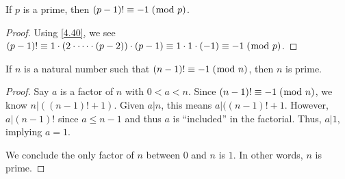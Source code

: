 \documentclass[../main.tex]{subfiles}
\begin{document}
\begin{thm} \label{4.41}
  If $p$ is a prime, then $(p-1)! \equiv -1 \; (\bmod \; p)$.
\end{thm}

\begin{proof}
  Using \ref{4.40}, we see $(p-1)! \equiv 1 \cdot (2 \cdot \cdots \cdot (p-2)) \cdot (p-1) \equiv 1 \cdot 1 \cdot (-1) \equiv -1 \; (\bmod \; p)$.
\end{proof}



\begin{thm} \label{4.42}
  If $n$ is a natural number such that $(n-1)! \equiv -1 \; (\bmod \; n)$, then $n$ is prime.
\end{thm}

\begin{proof}
  Say $a$ is a factor of $n$ with $0 < a < n$. Since $(n-1)! \equiv -1 \; (\bmod \; n)$, we know $n | ((n-1)! + 1)$. Given $a | n$, this means $a | ((n-1)! + 1$. However, $a | (n-1)!$ since $a \leq n-1$ and thus $a$ is ``included'' in the factorial. Thus, $a | 1$, implying $a = 1$.

  We conclude the only factor of $n$ between $0$ and $n$ is $1$. In other words, $n$ is prime.
\end{proof}
\end{document}
